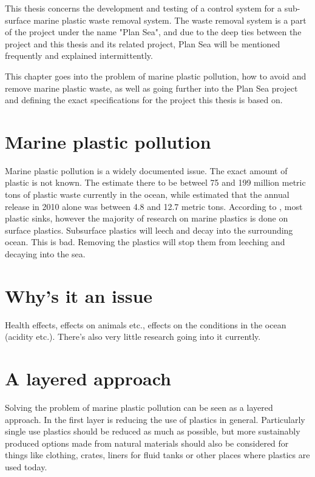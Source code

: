 \documentclass[class=article, crop=false]{standalone}
\begin{document}
This thesis concerns the development and testing of a control system for a sub-surface marine plastic waste removal system. The waste removal system is a part of the project under the name "Plan Sea", and due to the deep ties between the project and this thesis and its related project, Plan Sea will be mentioned frequently and explained intermittently.

This chapter goes into the problem of marine plastic pollution, how to avoid and remove marine plastic waste, as well as going further into the Plan Sea project and defining the exact specifications for the project this thesis is based on.


\section{Marine plastic pollution}
Marine plastic pollution is a widely documented issue. The exact amount of plastic is not known. The \citet{world_economic_forum_top_2022} estimate there to be betweel 75 and 199 million metric tons of plastic waste currently in the ocean, while \citet{jambeck_plastic_2015} estimated that the annual release in 2010 alone was between 4.8 and 12.7 metric tons. According to \citet{isobe_fate_2022}, most plastic sinks, however the majority of research on marine plastics is done on surface plastics. Subsurface plastics will leech and decay into the surrounding ocean. This is bad. Removing the plastics will stop them from leeching and decaying into the sea.


\section{Why's it an issue}
Health effects, effects on animals etc., effects on the conditions in the ocean (acidity etc.). There's also very little research going into it currently.

\section{A layered approach}
Solving the problem of marine plastic pollution can be seen as a layered approach. In the first layer is reducing the use of plastics in general. Particularly single use plastics should be reduced as much as possible, but more sustainably produced options made from natural materials should also be considered for things like clothing, crates, liners for fluid tanks or other places where plastics are used today.
\end{document}
